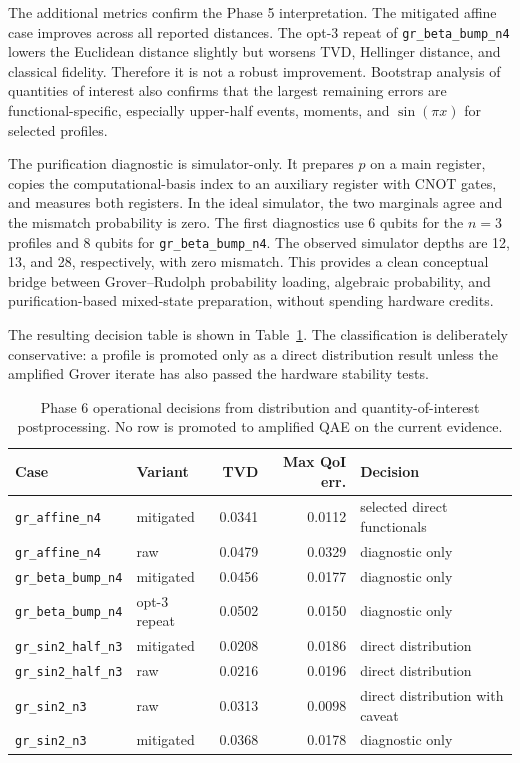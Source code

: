 The additional metrics confirm the Phase 5 interpretation. The mitigated affine
case improves across all reported distances. The opt-3 repeat of
\texttt{gr\_beta\_bump\_n4} lowers the Euclidean distance slightly but worsens
TVD, Hellinger distance, and classical fidelity. Therefore it is not a robust
improvement. Bootstrap analysis of quantities of interest also confirms that
the largest remaining errors are functional-specific, especially upper-half
events, moments, and \(\sin(\pi x)\) for selected profiles.

The purification diagnostic is simulator-only. It prepares \(p\) on a main
register, copies the computational-basis index to an auxiliary register with
CNOT gates, and measures both registers. In the ideal simulator, the two
marginals agree and the mismatch probability is zero. The first diagnostics use
6 qubits for the \(n=3\) profiles and 8 qubits for
\texttt{gr\_beta\_bump\_n4}. The observed simulator depths are 12, 13, and 28,
respectively, with zero mismatch. This provides a clean conceptual bridge
between Grover--Rudolph probability loading, algebraic probability, and
purification-based mixed-state preparation, without spending hardware credits.

The resulting decision table is shown in
Table~\ref{tab:phase6-decision-table}. The classification is deliberately
conservative: a profile is promoted only as a direct distribution result unless
the amplified Grover iterate has also passed the hardware stability tests.

\begin{table}[h]
\centering
\begin{tabular}{llrrl}
\toprule
Case & Variant & TVD & Max QoI err. & Decision \\
\midrule
\texttt{gr\_affine\_n4} & mitigated & 0.0341 & 0.0112
& selected direct functionals \\
\texttt{gr\_affine\_n4} & raw & 0.0479 & 0.0329
& diagnostic only \\
\texttt{gr\_beta\_bump\_n4} & mitigated & 0.0456 & 0.0177
& diagnostic only \\
\texttt{gr\_beta\_bump\_n4} & opt-3 repeat & 0.0502 & 0.0150
& diagnostic only \\
\texttt{gr\_sin2\_half\_n3} & mitigated & 0.0208 & 0.0186
& direct distribution \\
\texttt{gr\_sin2\_half\_n3} & raw & 0.0216 & 0.0196
& direct distribution \\
\texttt{gr\_sin2\_n3} & raw & 0.0313 & 0.0098
& direct distribution with caveat \\
\texttt{gr\_sin2\_n3} & mitigated & 0.0368 & 0.0178
& diagnostic only \\
\bottomrule
\end{tabular}
\caption{Phase 6 operational decisions from distribution and
quantity-of-interest postprocessing. No row is promoted to amplified QAE on the
current evidence.}
\label{tab:phase6-decision-table}
\end{table}

